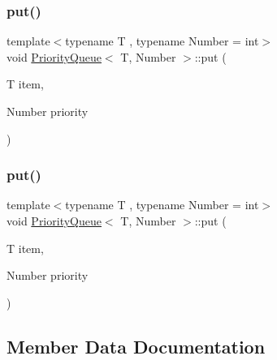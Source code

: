 \mbox{\label{structPriorityQueue_a9361c94664b98a15a91a595d65c9846c}} 
\subsubsection{\texorpdfstring{put()}{put()}\hspace{0.1cm}{\footnotesize\ttfamily [1/2]}}
{\footnotesize\ttfamily template$<$typename T , typename Number  = int$>$ \\
void \mbox{\hyperlink{structPriorityQueue}{Priority\+Queue}}$<$ T, Number $>$\+::put (\begin{DoxyParamCaption}\item[{T}]{item,  }\item[{Number}]{priority }\end{DoxyParamCaption})\hspace{0.3cm}{\ttfamily [inline]}}

\mbox{\label{structPriorityQueue_a9361c94664b98a15a91a595d65c9846c}} 
\subsubsection{\texorpdfstring{put()}{put()}\hspace{0.1cm}{\footnotesize\ttfamily [2/2]}}
{\footnotesize\ttfamily template$<$typename T , typename Number  = int$>$ \\
void \mbox{\hyperlink{structPriorityQueue}{Priority\+Queue}}$<$ T, Number $>$\+::put (\begin{DoxyParamCaption}\item[{T}]{item,  }\item[{Number}]{priority }\end{DoxyParamCaption})\hspace{0.3cm}{\ttfamily [inline]}}



\subsection{Member Data Documentation}
\mbox{\label{structPriorityQueue_a289cc383607c83fe77a0d571cb06bb01}} 
